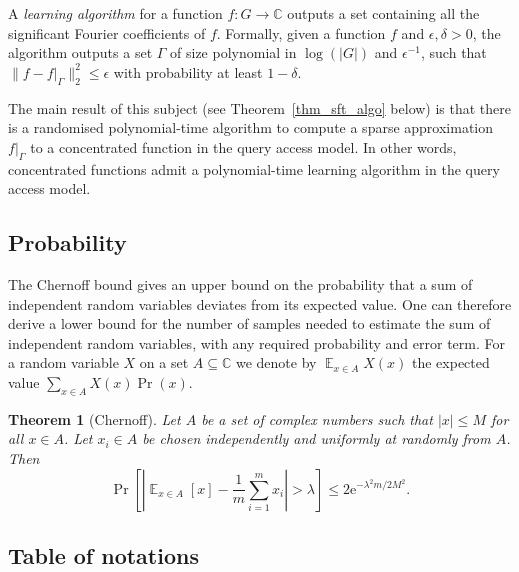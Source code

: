 \documentclass[11pt]{article}
\newtheorem{theorem}{Theorem}
\theoremstyle{definition}
\newcommand{\C}{\mathbb{C}}
\DeclareMathOperator*{\E}{\mathbb{E}}
\begin{document}
A \emph{learning algorithm} for a function $f:G\to\C$ outputs a set containing all the significant Fourier coefficients of $f$. Formally, given a function $f$ and $\epsilon, \delta > 0$, the algorithm outputs a set $\Gamma$ of size polynomial in $\log(|G|)$ and $\epsilon^{-1}$, such that $\| f - f|_\Gamma \|_{2}^{2} \leq \epsilon$ with probability at least $1-\delta$.

The main result of this subject (see Theorem~\ref{thm_sft_algo} below) is that there is a randomised polynomial-time algorithm to compute a sparse approximation $f|_\Gamma$ to a concentrated function in the query access model. In other words, concentrated functions admit a polynomial-time learning algorithm in the query access model.


\subsection{Probability}

The Chernoff bound gives an upper bound on the probability that a sum of independent random variables deviates from its expected value. One can therefore derive a lower bound for the number of samples needed to estimate the sum of independent random variables, with any required probability and error term. For a random variable $X$ on a set $A \subseteq \C$ we denote by $\E_{x \in A} X(x)$ the expected value $\sum_{x \in A} X(x) \Pr(x)$.


\begin{theorem}[Chernoff] \label{Chernoff}
    Let $A$ be a set of complex numbers such that $|x|\leq M$ for all $x\in A$. Let $x_i\in A$ be chosen independently and uniformly at randomly from $A$. Then
    \[
        \Pr\left[\left|\E_{x\in A}[x]-\frac{1}{m}\sum_{i=1}^mx_i\right| > \lambda \right]\leq 2 \mathrm{e}^{-\lambda^2 m / 2 M^2} .
    \]
\end{theorem}


\subsection{Table of notations}\label{sec:table}
\end{document}
